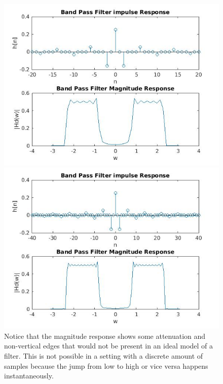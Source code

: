 \documentclass{article}
\begin{document}
\begin{figure}[H]
\includegraphics[scale = .5]{1_bpf_20}
\includegraphics[scale = .5]{1_bpf_40}
\\ Notice that the magnitude response shows some attenuation and non-vertical edges that would not be present in an ideal model of a filter. This is not possible in a setting with a discrete amount of samples because the jump from low to high or vice versa happens instantaneously.
\end{figure}
\end{document}

